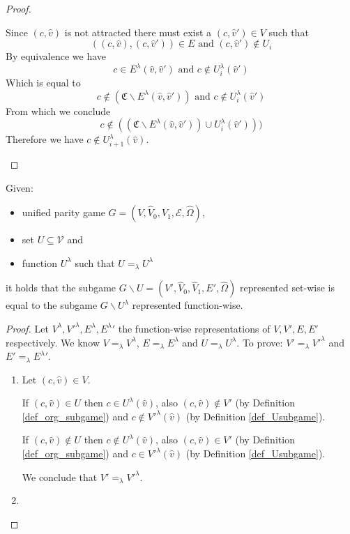 \begin{lemma}
\begin{proof}
\begin{itemize}
			Since $(c,\hat{v})$ is not attracted there must exist a $(c,\hat{v}') \in V$ such that 
			\[ ((c,\hat{v}),(c,\hat{v}')) \in E  \text{ and } (c,\hat{v}') \notin U_i \]
			By equivalence we have 
			\[ c \in E^\lambda(\hat{v},\hat{v}')  \text{ and } c \notin U^\lambda_i(\hat{v}') \]
			Which is equal to
			\[ c \notin (\mathfrak{C} \backslash E^\lambda(\hat{v},\hat{v}'))  \text{ and } c \notin U^\lambda_i(\hat{v}') \]
			From which we conclude
			\[ c \notin ((\mathfrak{C} \backslash E^\lambda(\hat{v},\hat{v}')) \cup U^\lambda_i(\hat{v}'))) \]
			Therefore we have $c \notin U^\lambda_{i+1}(\hat{v})$.
		\end{itemize}
	\end{proof}
\end{lemma}

\begin{lemma}
	\label{lem_subgame_eq}
	Given:
	\begin{itemize}
		\item unified parity game $G = ({V},\hat{V}_0,\hat{V}_1, \mathcal{E}, \hat{\Omega})$,
		\item set ${U} \subseteq \mathcal{V}$ and
		\item function $U^\lambda$ such that $U =_\lambda U^\lambda$
	\end{itemize}
it holds that the subgame $G \backslash {U} = ({V}',\hat{V}_0,\hat{V}_1,{E}',\hat{\Omega})$ represented set-wise is equal to the subgame $G\backslash U^\lambda$ represented function-wise.
	\begin{proof}
		Let  $V^\lambda,{V'}^\lambda, E^\lambda, {E^\lambda}'$ the function-wise representations of $V,V',E,E'$ respectively. We know $V =_\lambda V^\lambda$, $E =_\lambda E^\lambda$ and $U =_\lambda U^\lambda$. To prove: $V' =_\lambda {V'}^\lambda$ and $E' =_\lambda {E^\lambda}'$.
		
		\begin{enumerate}
			\item Let $(c,\hat{v}) \in V$.
			
			If $(c,\hat{v}) \in U$ then $c \in U^\lambda(\hat{v})$, also $(c,\hat{v}) \notin V'$ (by Definition \ref{def_org_subgame}) and $c \notin {V'}^\lambda(\hat{v})$ (by Definition \ref{def_Usubgame}).
			
			If $(c,\hat{v}) \notin U$ then $c \notin U^\lambda(\hat{v})$, also $(c,\hat{v}) \in V'$ (by Definition \ref{def_org_subgame}) and $c \in {V'}^\lambda(\hat{v})$ (by Definition \ref{def_Usubgame}).
			
			We conclude that $V' =_\lambda {V'}^\lambda$.
			\item 
			

\end{enumerate}
\end{proof}
\end{lemma}
